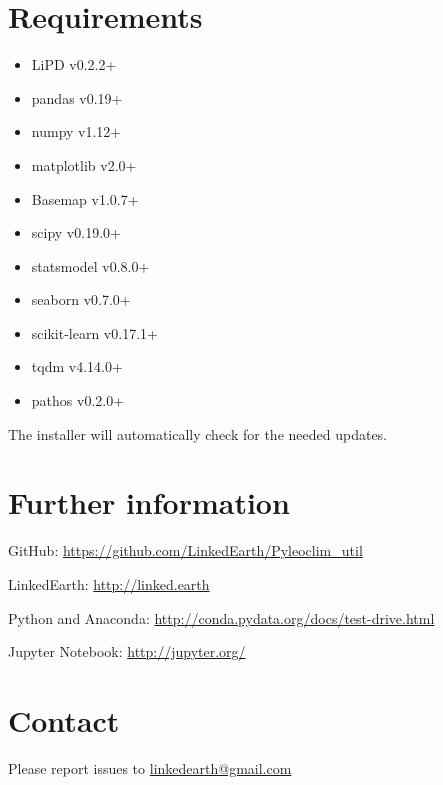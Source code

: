 \documentclass[letterpaper,10pt,english]{sphinxmanual}
\begin{document}
\section{Requirements}
\label{\detokenize{Introduction:requirements}}\begin{itemize}
\item {} 
LiPD v0.2.2+

\item {} 
pandas v0.19+

\item {} 
numpy v1.12+

\item {} 
matplotlib v2.0+

\item {} 
Basemap v1.0.7+

\item {} 
scipy v0.19.0+

\item {} 
statsmodel v0.8.0+

\item {} 
seaborn v0.7.0+

\item {} 
scikit-learn v0.17.1+

\item {} 
tqdm v4.14.0+

\item {} 
pathos v0.2.0+

\end{itemize}

The installer will automatically check for the needed updates.


\section{Further information}
\label{\detokenize{Introduction:further-information}}
\begin{DUlineblock}{0em}
\item[] GitHub: \url{https://github.com/LinkedEarth/Pyleoclim\_util}
\item[] LinkedEarth: \url{http://linked.earth}
\item[] Python and Anaconda: \url{http://conda.pydata.org/docs/test-drive.html}
\item[] Jupyter Notebook: \url{http://jupyter.org/}
\end{DUlineblock}


\section{Contact}
\label{\detokenize{Introduction:contact}}
Please report issues to \href{mailto:linkedearth@gmail.com}{linkedearth@gmail.com}
\end{document}

